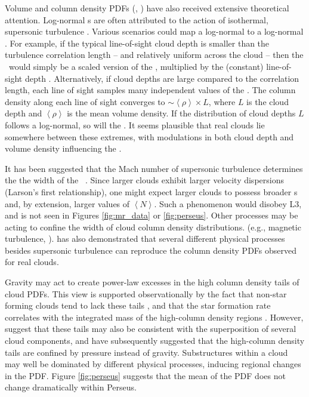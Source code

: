 Volume and column density PDFs (\rhopdf, \npdf) have also received extensive theoretical attention. Log-normal \rhopdf s are often attributed to the action of isothermal, supersonic turbulence \citep{Vaz94, Padoan97, Passot98}. Various scenarios could map a log-normal \rhopdf to a log-normal \npdf. For example, if the typical line-of-sight cloud depth is smaller than the turbulence correlation length -- and relatively uniform across the cloud -- then the \npdf\, would simply be a scaled version of the \rhopdf, multiplied by the (constant) line-of-sight depth \citep{Vaz01, Ballesteros11}. Alternatively, if cloud depths are large compared to the correlation length, each line of sight samples many independent values of the \rhopdf. The column density along each line of sight converges to $\sim \left<\rho\right> \times L$, where $L$ is the cloud depth and $\left<\rho\right>$ is the mean volume density. If the distribution of cloud depths $L$ follows a log-normal, so will the \npdf. It seems plausible that real clouds lie somewhere between these extremes, with modulations in both cloud depth and volume density influencing the \npdf.

It has been suggested that the Mach number of supersonic turbulence determines the the width of the \rhopdf\, \citep{Passot98}. Since larger clouds exhibit larger velocity dispersions (Larson's first relationship), one might expect larger clouds to possess broader \npdf s and, by extension, larger values of $\left<N\right>$. Such a phenomenon would disobey L3, and is not seen in Figures \ref{fig:mr_data} or \ref{fig:perseus}.  Other processes may be acting to confine the width of cloud column density distributions. (e.g., magnetic turbulence, \citealt{Ostriker01}). \cite{Tassis10} has also demonstrated that several different physical processes besides supersonic turbulence can reproduce the column density PDFs observed for real clouds.

Gravity may act to create power-law excesses in the high column density tails of cloud PDFs. This view is supported observationally by the fact that non-star forming clouds tend to lack these tails \citep{Kainulainen09}, and that the star formation rate correlates with the integrated mass of the high-column density regions \citep{Lada10}. However, \cite{Alves12} suggest that these tails may also be consistent with the superposition of several cloud components, and \cite{Kainulainen11} have subsequently suggested that the high-column density tails are confined by pressure instead of gravity. Substructures within a cloud may well be dominated by different physical processes, inducing regional changes in the PDF. Figure \ref{fig:perseus} suggests that the mean of the PDF does not change dramatically within Perseus.

